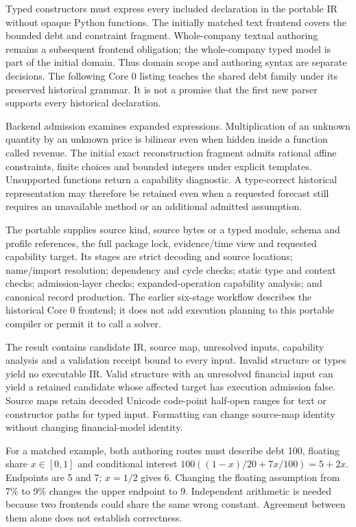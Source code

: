 Typed constructors must express every included declaration in the portable IR
without opaque Python functions. The initially matched text frontend covers the
bounded debt and constraint fragment. Whole-company textual authoring remains
a subsequent frontend obligation; the whole-company typed model is part of the
initial domain. Thus domain scope and authoring syntax are separate decisions.
The following Core 0 listing teaches the shared debt family under its preserved
historical grammar. It is not a promise that the first new parser supports every
historical declaration.

Backend admission examines expanded expressions. Multiplication of an unknown
quantity by an unknown price is bilinear even when hidden inside a function
called revenue. The initial exact reconstruction fragment admits rational affine
constraints, finite choices and bounded integers under explicit templates.
Unsupported functions return a capability diagnostic. A type-correct historical
representation may therefore be retained even when a requested forecast still
requires an unavailable method or an additional admitted assumption.

The portable  supplies source kind, source bytes or a typed
module, schema and profile references, the full package lock, evidence/time view
and requested capability target. Its stages are strict decoding and source
locations; name/import resolution; dependency and cycle checks; static type and
context checks; admission-layer checks; expanded-operation capability analysis;
and canonical record production. The earlier six-stage workflow describes the
historical Core 0 frontend; it does not add execution planning to this portable
compiler or permit it to call a solver.

The result contains candidate IR, source map, unresolved inputs, capability
analysis and a validation receipt bound to every input. Invalid structure or
types yield no executable IR. Valid structure with an unresolved financial input
can yield a retained candidate whose affected target has execution admission
false. Source maps retain decoded Unicode code-point half-open ranges for text
or constructor paths for typed input. Formatting can change source-map identity
without changing financial-model identity.

For a matched example, both authoring routes must describe debt 100, floating
share $x\in[0,1]$ and conditional interest
$100((1-x)/20+7x/100)=5+2x$. Endpoints are 5 and 7; $x=1/2$ gives 6. Changing
the floating assumption from 7\% to 9\% changes the upper endpoint to 9.
Independent arithmetic is needed because two frontends could share the same
wrong constant. Agreement between them alone does not establish correctness.
